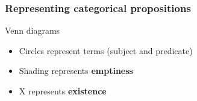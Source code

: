 \documentclass[10pt,letterpaper,xcolor=dvipsnames,handout]{beamer}
\begin{document}
\begin{frame}
\frametitle{Representing categorical propositions}

\begin{block}{Venn diagrams}
  \begin{itemize}
    \item<2-> Circles represent terms (subject and predicate)
    \item<3-> Shading represents \textbf{emptiness}
    \item<5-> X represents \textbf{existence}
  \end{itemize}
\end{block}

\begin{center}
\end{center}

\end{frame}
\end{document}

